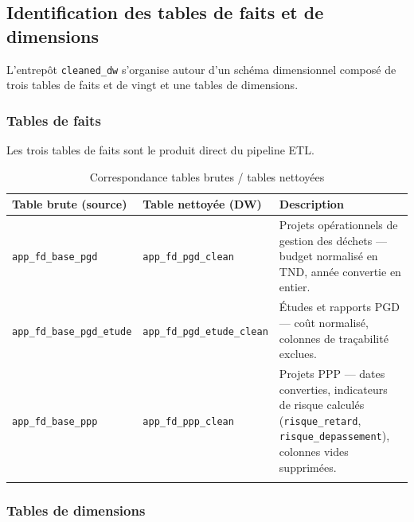 \begin{longtable}
\captionsetup{justification=centering,margin=2cm}
\caption{Inspection de la table brute \texttt{app\_fd\_base\_ppp}}
\label{tab:inspection_ppp}
\end{longtable}

\subsection{Identification des tables de faits et de dimensions}

L'entrepôt \texttt{cleaned\_dw} s'organise autour d'un schéma
dimensionnel composé de trois tables de faits et de vingt et une
tables de dimensions.

\subsubsection{Tables de faits}

Les trois tables de faits sont le produit direct du pipeline ETL.

\begin{longtable}{|p{4.5cm}|p{4cm}|p{6cm}|}
\hline
\textbf{Table brute (source)} & \textbf{Table nettoyée (DW)} &
\textbf{Description} \\
\hline
\endhead

\texttt{app\_fd\_base\_pgd} &
\texttt{app\_fd\_pgd\_clean} &
Projets opérationnels de gestion des déchets — budget normalisé en
TND, année convertie en entier. \\
\hline

\texttt{app\_fd\_base\_pgd\_etude} &
\texttt{app\_fd\_pgd\_etude\_clean} &
Études et rapports PGD — coût normalisé, colonnes de traçabilité
exclues. \\
\hline

\texttt{app\_fd\_base\_ppp} &
\texttt{app\_fd\_ppp\_clean} &
Projets PPP — dates converties, indicateurs de risque calculés
(\texttt{risque\_retard}, \texttt{risque\_depassement}),
colonnes vides supprimées. \\
\hline

\captionsetup{justification=centering,margin=2cm}
\caption{Correspondance tables brutes / tables nettoyées}
\label{tab:tables_faits}
\end{longtable}

\subsubsection{Tables de dimensions}

